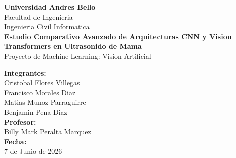\documentclass[12pt, a4paper]{article}
\begin{document}
\begin{titlepage}
    \centering
    \vspace*{1cm}

    {\Large \textbf{Universidad Andres Bello}}\\[0.5cm]
    {\large Facultad de Ingenieria}\\[0.2cm]
    {\large Ingenieria Civil Informatica}\\[2cm]

    {\Huge \textbf{Estudio Comparativo Avanzado de Arquitecturas CNN y Vision Transformers en Ultrasonido de Mama}}\\[1.5cm]

    {\Large Proyecto de Machine Learning: Vision Artificial}\\[2cm]

    \begin{flushright}
        \textbf{Integrantes:}\\
        Cristobal Flores Villegas\\
        Francisco Morales Diaz\\
        Matias Munoz Parraguirre\\
        Benjamin Pena Diaz\\[1cm]
        \textbf{Profesor:}\\
        Billy Mark Peralta Marquez\\[1cm]
        \textbf{Fecha:}\\
        7 de Junio de 2026
    \end{flushright}
    \vfill
\end{titlepage}

\newpage
\tableofcontents
\newpage

\begin{abstract}
Este informe tecnico detalla el desarrollo y evaluacion de sistemas avanzados de aprendizaje de maquinas aplicados al dataset BreastMNIST, un benchmark de clasificacion binaria de imagenes de ultrasonido de mama. Se contrasta el rendimiento de arquitecturas convolucionales clasicas (MobileNetV2 y EfficientNetB0) frente a un Vision Transformer (ViT) personalizado, analizando el impacto de la resolucion espacial de entrada ($28\times28$ vs. $128\times128$ pixeles). Los resultados evidencian que las CNN ligeras con sesgos inductivos espaciales dominan sobre los Transformers en regimenes de datos pequenos, y que el desbalance de clases convierte al AUC-ROC en la metrica central del analisis, relegando a la exactitud a un rol meramente descriptivo.
\end{abstract}
\end{document}

